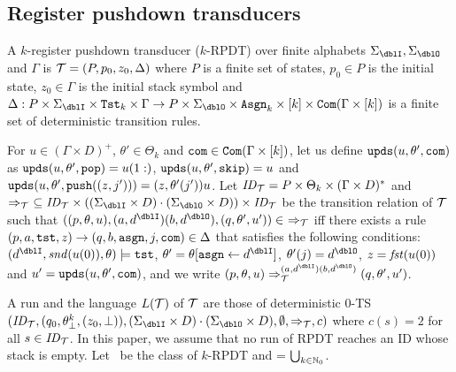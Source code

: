 \subsection{Register pushdown transducers}
\begin{definition}
A $k$-{register pushdown transducer} ($k$-RPDT) over finite alphabets $\Sigma_\dblI,\Sigma_\dblO$ and $\Gamma$ is
${\cal T}=(P, p_0, z_0, \Delta)$ where
$P$ is a finite set of states,
$p_0\in P$ is the initial state,
$z_0\in \Gamma$ is the initial stack symbol and
$\Delta: P\times\Sigma_\dblI\times\Tst_k\times\Gamma \to P\times\Sigma_\dblO\times \Asgn_k \times [k]\times \Com(\Gamma\times[k])$ is a finite set of deterministic transition rules.
\end{definition}
For $u\in (\Gamma\times D)^+$, $\theta'\in\Theta_k$ and $\mathtt{com}\in\mathtt{Com}(\Gamma\times[k])$, let us define $\mathtt{upds}(u,\theta',\mathtt{com})$ as $\mathtt{upds}(u,\theta',\mathtt{pop})=u(1:)$, $\mathtt{upds}(u,\theta',\mathtt{skip})=u$ and $\mathtt{upds}(u,\theta',\mathtt{push}((z,j')))=(z,\theta'(j'))u$.
Let $\mathit{ID}_{\cal T}= P\times \Theta_k\times (\Gamma\times D)^*$
and $\Rightarrow_\calT\ \subseteq \ID_\calT\times ((\Sigma_\dblI\times D)\cdot(\Sigma_\dblO\times D))\times \ID_\calT$ be the transition relation of ${\cal T}$ such that $((p, \theta, u), (a,d^\dblI)(b,d^\dblO), (q, \theta', u'))\in\ \Rightarrow_\calT$ iff
there exists a rule $(p, a, \mathtt{tst}, z) \to (q, b, \mathtt{asgn}, j, \mathtt{com}) \in \Delta$
that satisfies the following conditions:
$(d^\dblI, \scnd(u(0)), \theta)\models\tst$, $\theta' = \theta[\asgn\leftarrow d^\dblI]$, $\theta'(j) = d^\dblO$,
$z=\mathit{fst}(u(0))$ and
$u'=\mathtt{upds}(u,\theta',\mathtt{com})$,
and we write $(p, \theta, u) \done_{\calT}^{(a,d^\dblI)(b,d^\dblO)}(q, \theta', u')$.

A run and the language $L({\cal T})$ of ${\cal T}$ are those of deterministic $0$-TS $(\ID_\calT, (q_0,\theta^k_\bot, (z_0,\bot)), (\Sigma_\dblI\times D)\cdot(\Sigma_\dblO\times D), \emptyset, \Rightarrow_\calT, c)$ where $c(s)=2$ for all $s\in\mathit{ID}_{\cal T}$.
In this paper,
we assume that no run of RPDT reaches an ID whose stack is empty.
Let \RPDTk\ be the class of $k$-RPDT and \RPDT = $\bigcup_{k\in\mathbb{N}_0}$\RPDTk.

